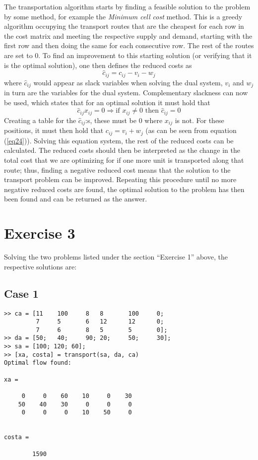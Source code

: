 \documentclass{article}
\begin{document}
  \noindent
  The transportation algorithm starts by finding a feasible solution to the
  problem by some method, for example the \textit{Minimum cell cost}
  method. This is a greedy algorithm occupying the
  transport routes that are the cheapest for each row in the cost matrix and
  meeting the respective supply and demand, starting with the first row and
  then doing the same for each consecutive row. The rest of the routes are set
  to 0.  To find an improvement to this starting solution (or verifying that it
  is the optimal solution), one then defines the reduced costs as
  \begin{equation}
    \hat{c}_{ij} = c_{ij} - v_i - w_j
    \label{eq24}
  \end{equation}
  where $\hat{c}_{ij}$ would appear as slack variables when solving the dual
  system, $v_i$ and $w_j$ in turn are the variables for the dual system.
  Complementary slackness can now be used, which states that for an optimal
  solution it must hold that
  \begin{equation}
    \hat{c}_{ij}x_{ij} = 0 \Rightarrow \text{if } x_{ij} \neq 0 \text{ then } \hat{c}_{ij} = 0
  \end{equation}
  Creating a table for the $\hat{c}_{ij}$:s, these must be 0 where $x_{ij}$ is
  not. For these positions, it must then hold that $c_{ij} = v_i + w_j$ (as can
  be seen from equation (\ref{eq24})). Solving this equation system, the rest
  of the reduced costs can be calculated. The reduced costs should then be
  interpreted as the change in the total cost that we are optimizing for if one
  more unit is transported along that route; thus, finding a negative reduced
  cost means that the solution to the transport problem can be improved.
  Repeating this procedure until no more negative reduced costs are found, the
  optimal solution to the problem has then been found and can be returned as
  the answer.

  \section*{Exercise 3}
  Solving the two problems listed under the section ``Exercise 1'' above, the
  respective solutions are:

  \subsection*{Case 1}
  \begin{lstlisting}
>> ca = [11    100     8   8       100     0;
         7     5       6   12      12      0;
         7     6       8   5       5       0];
>> da = [50;   40;     90; 20;     50;     30];
>> sa = [100; 120; 60];
>> [xa, costa] = transport(sa, da, ca)
Optimal flow found:

xa =

     0     0    60    10     0    30
    50    40    30     0     0     0
     0     0     0    10    50     0


costa =

        1590
  \end{lstlisting}
\end{document}
